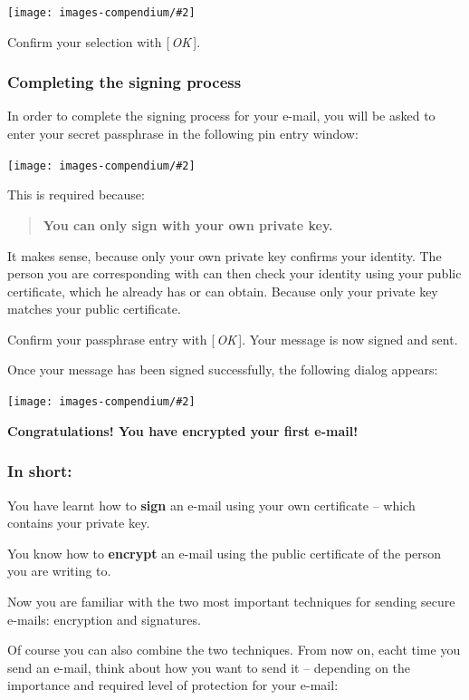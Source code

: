 \documentclass[a4paper,11pt,oneside,openright,titlepage]{scrbook}
\newcommand{\Button}[1]{[\,\textit{#1}\,]}
\newcommand{\Email}{e-mail}
\newcommand{\IncludeImage}[2][]{
\begin{center}
  \texttt{[image: images-compendium/\#2]}%
\end{center}
}
\begin{document}
\IncludeImage[width=0.85\textwidth]{sc-kleopatra-sign-selectCertificate_en}

Confirm your selection with \Button{OK}.


\clearpage
\subsubsection{Completing the signing process}
In order to complete the signing process for your \Email{}, you will be asked to enter your secret passphrase in the following pin entry window:

\IncludeImage[width=0.5\textwidth]{sc-kleopatra-sign-OpenpgpPinentry_en}

This is required because:
\begin{quote}
    \textbf{You can only sign with your own private key.}
\end{quote}
It makes sense, because only your own private key confirms your identity. The person you are corresponding with can then check your identity using your public certificate, which he already has or can obtain. Because only your private key matches your public certificate.

Confirm your passphrase entry with \Button{OK}. Your message is now signed and sent.

Once your message has been signed successfully, the following dialog appears:

\IncludeImage[width=0.85\textwidth]{sc-kleopatra-sign-successful_de}

\textbf{Congratulations! You have encrypted your first \Email{}!}


\clearpage
\subsubsection{In short:}
You have learnt how to \textbf{sign} an \Email{} using your own
certificate -- which contains your private key.

You know how to \textbf{encrypt} an \Email{} using the public
certificate of the person you are writing to.

Now you are familiar with the two most important techniques for
sending secure \Email{}s: encryption and signatures.

Of course you can also combine the two techniques. From now on, eacht
time you send an \Email{}, think about how you want to send it --
depending on the importance and required level of protection for your
\Email{}:
\end{document}

